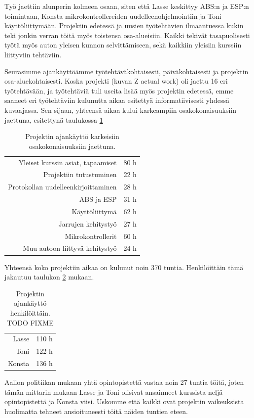 \documentclass{article}
\begin{document}
Työ jaettiin alunperin kolmeen osaan, siten että Lasse keskittyy ABS:n ja ESP:n toimintaan, Konsta mikrokontrollereiden uudelleenohjelmointiin ja Toni käyttöliittymään. Projektin edetessä ja uusien työtehtävien ilmaantuessa kukin teki jonkin verran töitä myös toistensa osa-alueisiin. Kaikki tekivät tasapuolisesti työtä myös auton yleisen kunnon selvittämiseen, sekä kaikkiin yleisiin kurssiin liittyviin tehtäviin.

Seurasimme ajankäyttöämme työtehtäväkohtaisesti, päiväkohtaisesti ja projektin osa-aluekohtaisesti. Koska projekti (kuvan Z actual work) oli jaettu 16 eri työtehtävään, ja työtehtäviä tuli useita lisää myös projektin edetessä, emme saaneet eri työtehtäviin kulunutta aikaa esitettyä informatiivisesti yhdessä kuvaajassa. Sen sijaan, yhteensä aikaa kului karkeampiin osakokonaisuuksiin jaettuna, esitettynä taulukossa \ref{tab:osakok-ajat}

\begin{table}
	\caption{Projektin ajankäyttö karkeisiin osakokonaisuuksiin jaettuna.}
	\label{tab:osakok-ajat}
	\centering \begin{tabular}{ r l }
	Yleiset kurssin asiat, tapaamiset & 80 h\\
	Projektiin tutustuminen & 22 h\\
	Protokollan uudelleenkirjoittaminen & 28 h\\
	ABS ja ESP & 31 h\\
	Käyttöliittymä & 62 h\\
	Jarrujen kehitystyö & 27 h\\
	Mikrokontrollerit & 60 h\\
	Muu autoon liittyvä kehitystyö & 24 h\\
	\end{tabular}
\end{table}


Yhteensä koko projektiin aikaa on kulunut noin 370 tuntia. Henkilöittäin tämä jakautuu taulukon \ref{tab:henk-ajat} mukaan.

\begin{table}
	\caption{Projektin ajankäyttö henkilöittäin. TODO FIXME}
	\label{tab:henk-ajat}
	\centering \begin{tabular}{ r l }
	Lasse & 110 h\\
	Toni & 122 h\\
	Konsta & 136 h
	\end{tabular}
\end{table}

Aallon politiikan mukaan yhtä opintopistettä vastaa noin 27 tuntia töitä, joten tämän mittarin mukaan Lasse ja Toni olisivat ansainneet kurssista neljä opintopistettä ja Konsta viisi. Uskomme että kaikki ovat projektin vaikeuksista huolimatta tehneet ansioituneesti töitä näiden tuntien eteen.
\end{document}
